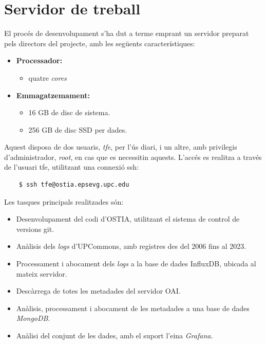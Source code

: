 \chapter{Servidor de treball}\label{ch:server-description}

El procés de desenvolupament s’ha dut a terme emprant un servidor preparat pels directors del projecte, amb les següents característiques:

\begin{itemize}
    \item \textbf{Processador:}
    \begin{itemize}
        \item quatre \textit{cores}
    \end{itemize}
    \item \textbf{Emmagatzemament:}
    \begin{itemize}
        \item 16 GB de disc de sistema.
        \item 256 GB de disc SSD per dades.
    \end{itemize}
\end{itemize}

\noindent
Aquest disposa de dos usuaris, \textit{tfe}, per l’ús diari, i un altre, amb privilegis d’administrador, \textit{root}, en cas que es necessitin aquests.
L’accés es realitza a través de l’usuari tfe, utilitzant una connexió \gls{ssh}:

\begin{verbatim}
    $ ssh tfe@ostia.epsevg.upc.edu
\end{verbatim}

\noindent
Les tasques principals realitzades són:

\begin{itemize}
    \item Desenvolupament del codi d’\gls{OSTIA}, utilitzant el sistema de control de versions git.
    \item Anàlisis dels \textit{\gls{log}s} d’\gls{UPCommons}, amb registres des del 2006 fins al 2023.
    \item Processament i abocament dels \textit{\gls{log}s} a la base de dades InfluxDB, ubicada al mateix servidor.
    \item Descàrrega de totes les metadades del servidor \gls{OAI}.
    \item Anàlisis, processament i abocament de les metadades a una base de dades \textit{MongoDB}.
    \item Anàlisi del conjunt de les dades, amb el suport l’eina \textit{Grafana}.
\end{itemize}

